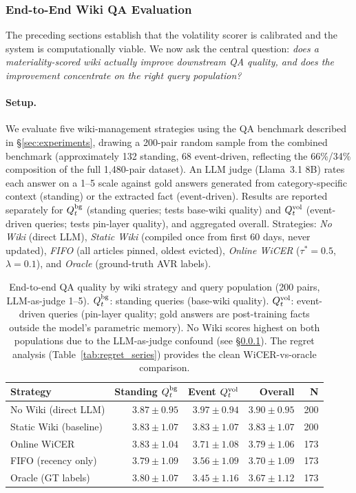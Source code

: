 \documentclass{article}
\begin{document}
\subsubsection{End-to-End Wiki QA Evaluation}
\label{sec:qa_eval}

The preceding sections establish that the volatility scorer is calibrated and the system is computationally viable.
We now ask the central question: \emph{does a materiality-scored wiki actually improve downstream QA quality, and does the improvement concentrate on the right query population?}

\paragraph{Setup.}
We evaluate five wiki-management strategies using the QA benchmark described in \S\ref{sec:experiments}, drawing a 200-pair random sample from the combined benchmark (approximately 132 standing, 68 event-driven, reflecting the 66\%/34\% composition of the full 1{,}480-pair dataset).
An LLM judge (Llama~3.1 8B) rates each answer on a 1--5 scale against gold answers generated from category-specific context (standing) or the extracted fact (event-driven).
Results are reported separately for $Q_t^{\textup{bg}}$ (standing queries; tests base-wiki quality) and $Q_t^{\textup{vol}}$ (event-driven queries; tests pin-layer quality), and aggregated overall.
Strategies: \emph{No Wiki} (direct LLM), \emph{Static Wiki} (compiled once from first 60 days, never updated), \emph{FIFO} (all articles pinned, oldest evicted), \emph{Online WiCER} ($\tau^*{=}0.5$, $\lambda{=}0.1$), and \emph{Oracle} (ground-truth AVR labels).

\begin{table}[t]
\centering
\caption{End-to-end QA quality by wiki strategy and query population (200 pairs, LLM-as-judge 1--5).
$Q_t^{\textup{bg}}$: standing queries (base-wiki quality).
$Q_t^{\textup{vol}}$: event-driven queries (pin-layer quality; gold answers are post-training facts outside the model's parametric memory).
No Wiki scores highest on both populations due to the LLM-as-judge confound (see \S\ref{sec:qa_eval}).
The regret analysis (Table~\ref{tab:regret_series}) provides the clean WiCER-vs-oracle comparison.}
\label{tab:qa_quality}
\small
\begin{tabular}{@{}lrrrr@{}}
\toprule
\textbf{Strategy} & \textbf{Standing $Q_t^{\textup{bg}}$} & \textbf{Event $Q_t^{\textup{vol}}$} & \textbf{Overall} & \textbf{N} \\
\midrule
No Wiki (direct LLM)   & $3.87 \pm 0.95$ & $3.97 \pm 0.94$ & $3.90 \pm 0.95$ & 200 \\
Static Wiki (baseline) & $3.83 \pm 1.07$ & $3.83 \pm 1.07$ & $3.83 \pm 1.07$ & 200 \\
Online WiCER           & $3.83 \pm 1.04$ & $3.71 \pm 1.08$ & $3.79 \pm 1.06$ & 173 \\
FIFO (recency only)    & $3.79 \pm 1.09$ & $3.56 \pm 1.09$ & $3.70 \pm 1.09$ & 173 \\
Oracle (GT labels)     & $3.80 \pm 1.07$ & $3.45 \pm 1.16$ & $3.67 \pm 1.12$ & 173 \\
\bottomrule
\end{tabular}
\end{table}
\end{document}
